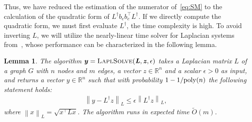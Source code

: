 \documentclass{article}
\def\len#1{\left\lVert #1 \right\rVert}
\newcommand{\eps}{\epsilon}
\newcommand{\rea}{\mathbb{R}}
\newcommand{\LaplSolver}{\textsc{LaplSolve}}
\newcommand{\VReffComp}{\textsc{VReffComp}}
\newcommand\yy{\boldsymbol{\mathit{y}}}
\newcommand\zz{\boldsymbol{\mathit{z}}}
\newcommand\xx{\boldsymbol{\mathit{x}}}
\newcommand\bb{\boldsymbol{\mathit{b}}}
\newcommand\LL{\bm{\mathit{L}}}
\newcommand\Otil{\widetilde{O}}
\newtheorem{theorem}[theo]{Theorem}
\newtheorem{lemma}[theo]{Lemma}
\begin{document}


Thus, we have reduced  the estimation of the numerator of~\eqref{eq:SM} to the calculation of the quadratic form of $\LL^\dag \bb_e \bb_e^\top \LL^\dag$. If we directly compute the quadratic form, we must first evaluate $\LL^\dag$, the time complexity is high.   To avoid inverting $\LL$, we will utilize the nearly-linear time solver for Laplacian systems from~\cite{kyng2016approximate}, whose
performance can be characterized in the following lemma.

\begin{lemma}
	\label{lem:laplsolver}
	The algorithm $\yy = \LaplSolver(\LL,\zz,\eps)$ takes a Laplacian matrix $\LL$ of a graph $G$ with $n$ nodes and $m$ edges, a vector $\zz \in \rea^n$ and a scalar $\eps > 0$ as input, and returns a vector $\yy \in \rea^n$ such that with probability $1-1/{\rm poly}(n)$ the following statement holds:
\small
	\begin{align*}
		\len{\yy - \LL^\dag \zz}_{\LL} \leq \eps
		\len{\LL^\dag \zz}_{\LL},
	\end{align*}
\normalsize
	where $\len{\xx}_{\LL} = \sqrt{\xx^\top \LL \xx}$.
	The algorithm runs in expected time
	$\Otil(m)$.
\end{lemma}



\end{document}
